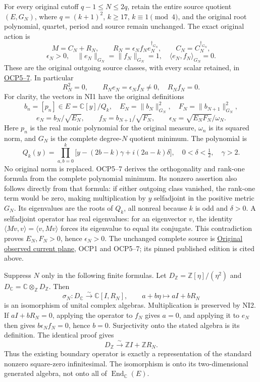 \documentclass[
]{article}
\begin{document}
For every original cutoff \(q-1\le N\le2q\), retain the entire source
quotient \((E,G_N)\), where \(q=(k+1)^2\), \(k\ge17\),
\(k\equiv1\pmod4\), and the original root polynomial, quartet, period
and source remain unchanged. The exact original action is \[
M=C_N+R_N,\qquad
R_N=\epsilon_N f_N e_N^{\dagger_{G_N}},\qquad
C_N=C_N^{\dagger_{G_N}},
\] \[
\epsilon_N>0,\quad \|e_N\|_{G_N}=\|f_N\|_{G_N}=1,
\quad \langle e_N,f_N\rangle_{G_N}=0.
\tag{NI1}
\] These are the original outgoing source classes, with every scalar
retained, in
\href{https://github.com/KokunoYumeto/zeta-function-research-reader/blob/5c69161ca70ee187f41df0bfe786e8b6eebed422/workbenches/splitzero-tandem/continuations/20260922-current-effective-cutoff/OBSERVED_CURRENT_PLANE.tex\#L90}{OCP5--7}.
In particular \[
R_N^2=0,\qquad R_Ne_N=\epsilon_Nf_N\ne0,\quad R_Nf_N=0.
\tag{NI2}
\] For clarity, the vectors in NI1 have the original definitions \[
b_n=[p_n]\in E=\mathbb C[y]/Q_k,
\quad E_N=\|b_N\|_{G_N}^2,\quad F_N=\|b_{N+1}\|_{G_N}^2,
\] \[
e_N=b_N/\sqrt{E_N},\qquad f_N=b_{N+1}/\sqrt{F_N},
\qquad \epsilon_N=\sqrt{E_NF_N}/\omega_N.
\] Here \(p_n\) is the real monic polynomial for the original measure,
\(\omega_n\) is its squared norm, and \(G_N\) is the complete
degree-\(N\) quotient minimum. The polynomial is \[
Q_k(y)=\prod_{a,b=0}^k\bigl[y-(2b-k)\gamma+i(2a-k)\delta\bigr],
\quad 0<\delta<\tfrac12,\quad\gamma>2.
\] No original norm is replaced. OCP5--7 derives the orthogonality and
rank-one formula from the complete polynomial minimum. Its nonzero
assertion also follows directly from that formula: if either outgoing
class vanished, the rank-one term would be zero, making multiplication
by \(y\) selfadjoint in the positive metric \(G_N\). Its eigenvalues are
the roots of \(Q_k\), all nonreal because \(k\) is odd and \(\delta>0\).
A selfadjoint operator has real eigenvalues: for an eigenvector \(v\),
the identity \(\langle Mv,v\rangle=\langle v,Mv\rangle\) forces its
eigenvalue to equal its conjugate. This contradiction proves
\(E_N,F_N>0\), hence \(\epsilon_N>0\). The unchanged complete source is
\href{https://github.com/KokunoYumeto/zeta-function-research-reader/blob/6af54ea3c8ef99127af327f3103e086c68d482c2/workbenches/splitzero-tandem/branches/identity-absorber-square/sources/OBSERVED_CURRENT_PLANE.tex}{Original
observed current plane}, OCP1 and OCP5--7; its pinned published edition
is cited above.

Suppress \(N\) only in the following finite formulas. Let
\(D_{\mathbb Z}=\mathbb Z[\eta]/(\eta^2)\) and
\(D_{\mathbb C}=\mathbb C\otimes_{\mathbb Z}D_{\mathbb Z}\). Then \[
\sigma_N:D_{\mathbb C}\xrightarrow{\sim}\mathbb C[I,R_N],
\qquad a+b\eta\longmapsto aI+bR_N
\tag{NI3}
\] is an isomorphism of unital complex algebras. Multiplication is
preserved by NI2. If \(aI+bR_N=0\), applying the operator to \(f_N\)
gives \(a=0\), and applying it to \(e_N\) then gives
\(b\epsilon_Nf_N=0\), hence \(b=0\). Surjectivity onto the stated
algebra is its definition. The identical proof gives \[
D_{\mathbb Z}\xrightarrow{\sim}\mathbb ZI+\mathbb ZR_N.
\tag{NI4}
\] Thus the existing boundary operator is exactly a representation of
the standard nonzero square-zero infinitesimal. The isomorphism is onto
its two-dimensional generated algebra, not onto all of
\(\operatorname{End}_{\mathbb C}(E)\).
\end{document}
